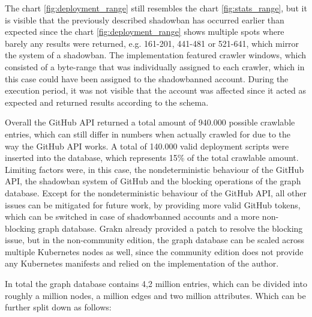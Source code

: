 The chart \ref{fig:deployment_range} still resembles the chart \ref{fig:stats_range}, but it is visible that the previously described shadowban has occurred earlier than expected since the chart \ref{fig:deployment_range} shows multiple spots where barely any results were returned, e.g. 161-201, 441-481 or 521-641, which mirror the system of a shadowban. The implementation featured crawler windows, which consisted of a byte-range that was individually assigned to each crawler, which in this case could have been assigned to the shadowbanned account. During the execution period, it was not visible that the account was affected since it acted as expected and returned results according to the schema.

Overall the GitHub API returned a total amount of 940.000 possible crawlable entries, which can still differ in numbers when actually crawled for due to the way the GitHub API works. A total of 140.000 valid deployment scripts were inserted into the database, which represents 15\% of the total crawlable amount. Limiting factors were, in this case, the nondeterministic behaviour of the GitHub API, the shadowban system of GitHub and the blocking operations of the graph database. Except for the nondeterministic behaviour of the GitHub API, all other issues can be mitigated for future work, by providing more valid GitHub tokens, which can be switched in case of shadowbanned accounts and a more non-blocking graph database. Grakn already provided a patch to resolve the blocking issue, but in the non-community edition, the graph database can be scaled across multiple Kubernetes nodes as well, since the community edition does not provide any Kubernetes manifests and relied on the implementation of the author.

In total the graph database contains 4,2 million entries, which can be divided into roughly a million nodes, a million edges and two million attributes. Which can be further split down as follows:

